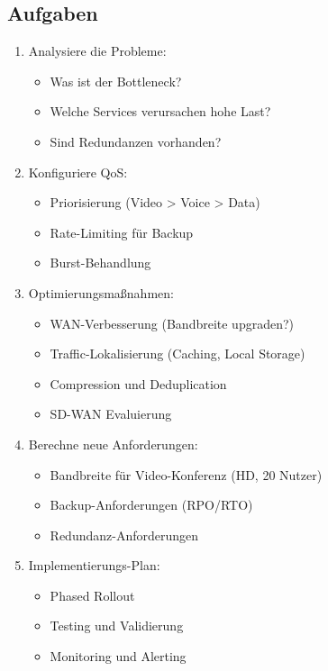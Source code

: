 \documentclass[12pt,a4paper,german]{report}
\begin{document}
\subsection{Aufgaben}
\begin{enumerate}
    \item Analysiere die Probleme:
    \begin{itemize}
        \item Was ist der Bottleneck?
        \item Welche Services verursachen hohe Last?
        \item Sind Redundanzen vorhanden?
    \end{itemize}
    \item Konfiguriere QoS:
    \begin{itemize}
        \item Priorisierung (Video > Voice > Data)
        \item Rate-Limiting für Backup
        \item Burst-Behandlung
    \end{itemize}
    \item Optimierungsmaßnahmen:
    \begin{itemize}
        \item WAN-Verbesserung (Bandbreite upgraden?)
        \item Traffic-Lokalisierung (Caching, Local Storage)
        \item Compression und Deduplication
        \item SD-WAN Evaluierung
    \end{itemize}
    \item Berechne neue Anforderungen:
    \begin{itemize}
        \item Bandbreite für Video-Konferenz (HD, 20 Nutzer)
        \item Backup-Anforderungen (RPO/RTO)
        \item Redundanz-Anforderungen
    \end{itemize}
    \item Implementierungs-Plan:
    \begin{itemize}
        \item Phased Rollout
        \item Testing und Validierung
        \item Monitoring und Alerting
    \end{itemize}
\end{enumerate}
\end{document}
